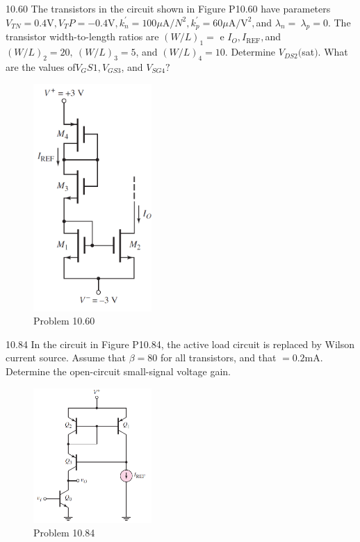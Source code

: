 \documentclass[a4paper,11pt,UTF8]{article}
\begin{document}
10.60 The transistors in the circuit shown in Figure P10.60 have parameters $V_{TN}= 0.4$V$, V_TP= - 0.4$V$, k_n^{\prime}= 100\mu$A$/N^2, k_{p}^{\prime}= 60\mu$A$/\mathrm{V} ^2, $and $\lambda_n=\:\lambda_p=0.$ The transistor width-to-length ratios are $(W/L)_1=$ e $I_{O}, I_{\mathrm{REF}}, $and $(W/L)_{2}=20,\:(W/L)_{3}=5$, and $(W/L)_{4}=10$. Determine $V_{DS2}( $sat$) .$ What are the values of$V_GS1, V_{GS3}$, and $V_{SG4}?$
\begin{figure}[H]
	\centering
	\includegraphics[width=0.4\textwidth]{10.60}
	\caption{Problem 10.60}
\end{figure}
10.84 In the circuit in Figure P10.84, the active load circuit is replaced by Wilson current source. Assume that $\beta=80$ for all transistors, and that $= 0.2$mA. Determine the open-circuit small-signal voltage gain.
\begin{figure}[H]
	\centering
	\includegraphics[width=0.4\textwidth]{10.84}
	\caption{Problem 10.84}
\end{figure}	
\end{document}
